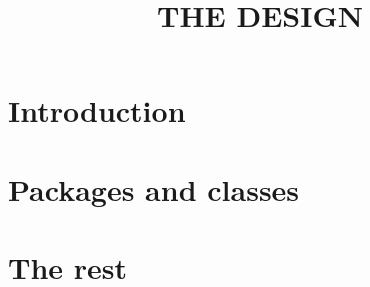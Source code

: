 \documentclass[a4paper, parskip=half]{scrartcl}
\title{THE DESIGN}
\begin{document}
\maketitle
\thispagestyle{empty}
\newpage
\tableofcontents
\newpage
\section{Introduction}
\section{Packages and classes}



\section{The rest}
\end{document}
